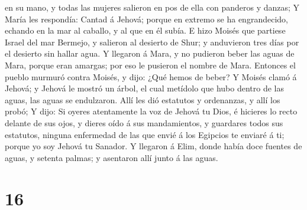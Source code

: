 en su mano, y todas las mujeres salieron en pos de ella con panderos y
danzas;  Y María les respondía: Cantad á Jehová; porque
en extremo se ha engrandecido, echando en la mar al caballo, y al que en
él subía.  E hizo Moisés que partiese Israel del mar
Bermejo, y salieron al desierto de Shur; y anduvieron tres días por el
desierto sin hallar agua.  Y llegaron á Mara, y no
pudieron beber las aguas de Mara, porque eran amargas; por eso le
pusieron el nombre de Mara.  Entonces el pueblo murmuró
contra Moisés, y dijo: ¿Qué hemos de beber?  Y Moisés
clamó á Jehová; y Jehová le mostró un árbol, el cual metídolo que hubo
dentro de las aguas, las aguas se endulzaron. Allí les dió estatutos y
ordenanzas, y allí los probó;  Y dijo: Si oyeres
atentamente la voz de Jehová tu Dios, é hicieres lo recto delante de sus
ojos, y dieres oído á sus mandamientos, y guardares todos sus estatutos,
ninguna enfermedad de las que envié á los Egipcios te enviaré á ti;
porque yo soy Jehová tu Sanador.  Y llegaron á Elim,
donde había doce fuentes de aguas, y setenta palmas; y asentaron allí
junto á las aguas.

\hypertarget{section-15}{%
\section{16}\label{section-15}}

